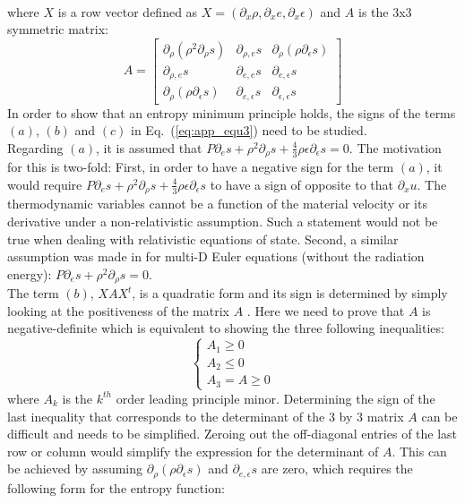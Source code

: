 \documentclass[review]{elsarticle}
\newcommand{\eqt}[1]{Eq.~(\ref{#1})}                     %
\begin{document}
\begin{appendices}
\begin{eqnarray}
 \end{eqnarray}
 where $X$ is a row vector defined as $X=\left( \partial_x \rho, \partial_x e, \partial_x \epsilon \right)$ and $A$ is the $3$x$3$ symmetric matrix:
 \begin{equation}
 A = 
 \left[
 \begin{array}{ccc}
\partial_{\rho} \left( \rho^2 \partial_{\rho} s \right) & \partial_{\rho,e} s & \partial_{\rho} \left( \rho \partial_{\epsilon} s \right) \\
 \partial_{\rho,e} s & \partial_{e,e} s & \partial_{e,\epsilon} s \\
 \partial_{\rho} \left( \rho \partial_{\epsilon} s \right) & \partial_{e,\epsilon} s & \partial_{\epsilon,\epsilon} s
 \end{array}
 \right]
 \end{equation}
 In order to show that an entropy minimum principle holds, the signs of the terms $(a)$, $(b)$ and $(c)$ in \eqt{eq:app_equ3} need to be studied.\\
Regarding $(a)$, it is assumed that $P \partial_e s + \rho^2 \partial_{\rho} s + \frac{4}{3} \rho \epsilon \partial_{\epsilon} s=0$. The motivation for this is two-fold: First, in order to have a negative sign for the term $(a)$, it would require $P \partial_e s + \rho^2 \partial_{\rho} s + \frac{4}{3} \rho \epsilon \partial_{\epsilon} s$ to have a sign of opposite to that $\partial_x u$. The thermodynamic variables cannot be a function of the material velocity or its derivative under a non-relativistic assumption. Such a statement would not be true when dealing with relativistic equations of state. Second, a similar assumption was made in \cite{jlg} for multi-D Euler equations (without the radiation energy): $P \partial_e s + \rho^2 \partial_{\rho} s = 0$.\\
The term $(b)$, $XAX^t$, is a quadratic form and its sign is determined by simply looking at the positiveness of the matrix $A$ \cite{Evans}. Here we need to prove that $A$ is negative-definite which is equivalent to showing the three following inequalities:
\begin{equation}
 \left\{
 \begin{array}{ccc}
 A_1 \geq 0 \\
 A_2 \leq 0 \\
 A_3 = A \geq 0
 \end{array}
 \right.
 \end{equation}
 where $A_k$ is the $k^{th}$ order leading principle minor. Determining the sign of the last inequality that corresponds to the determinant of the $3$ by $3$ matrix $A$ can be difficult and needs to be simplified. Zeroing out the off-diagonal entries of the last row or column would simplify the expression for the determinant of $A$. This can be achieved by assuming $\partial_{\rho}(\rho \partial_{\epsilon} s)$ and $\partial_{e, \epsilon} s$ are zero, which requires the following form for the entropy function:

\end{appendices}
\end{document}
